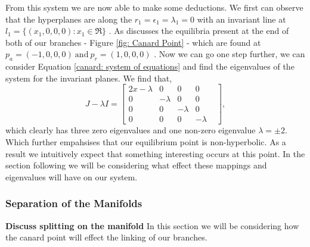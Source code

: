 From this system we are now able to make some deductions. We first can observe that the hyperplanes are along the $r_1=\epsilon_1=\lambda_1=0$ with an invariant line at $l_1=\{(x_1,0,0,0): x_1\in\Re\}$ \citep{krupa2001}. As \citet{krupa2001} discusses the equilibria present at the end of both of our branches - Figure \ref{fig: Canard Point} - which are found at $p_a=(-1,0,0,0) \ \text{and} \ p_r=(1,0,0,0)$ \citep{krupa2001}. Now we can go one step further, we can consider Equation \ref{canard: system of equations} and find the eigenvalues of the system for the invariant planes. We find that, 
\begin{equation}
J-\lambda I= \begin{bmatrix}
2x-\lambda & 0 & 0 & 0  \\
0 & -\lambda & 0 & 0&\\
0 & 0 & -\lambda & 0 \\
0 & 0 & 0 & -\lambda
\end{bmatrix},
\end{equation}
which clearly has three zero eigenvalues and one non-zero eigenvalue $\lambda=\pm 2$. Which further empahsises that our equilibrium point is non-hyperbolic. As a result we intuitively expect that something interesting occurs at this point. In the section following we will be considering what effect these mappings and eigenvalues will have on our system.

\subsubsection{Separation of the Manifolds}

\textbf{Discuss splitting on the manifold}
In this section we will be considering how the canard point will effect the linking of our branches.





